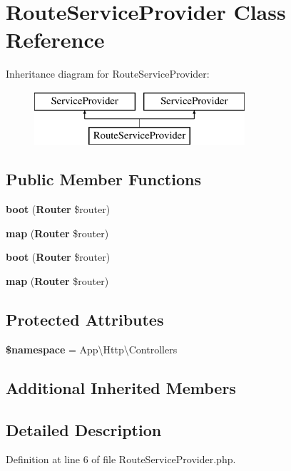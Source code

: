 \section{Route\+Service\+Provider Class Reference}
\label{class_app_1_1_providers_1_1_route_service_provider}
Inheritance diagram for Route\+Service\+Provider\+:\begin{figure}[H]
\begin{center}
\leavevmode
\includegraphics[height=2.000000cm]{class_app_1_1_providers_1_1_route_service_provider}
\end{center}
\end{figure}
\subsection*{Public Member Functions}
\begin{DoxyCompactItemize}
\item 
{\bf boot} ({\bf Router} \$router)
\item 
{\bf map} ({\bf Router} \$router)
\item 
{\bf boot} ({\bf Router} \$router)
\item 
{\bf map} ({\bf Router} \$router)
\end{DoxyCompactItemize}
\subsection*{Protected Attributes}
\begin{DoxyCompactItemize}
\item 
{\bf \$namespace} = \textquotesingle{}App\textbackslash{}\+Http\textbackslash{}\+Controllers\textquotesingle{}
\end{DoxyCompactItemize}
\subsection*{Additional Inherited Members}


\subsection{Detailed Description}


Definition at line 6 of file Route\+Service\+Provider.\+php.



